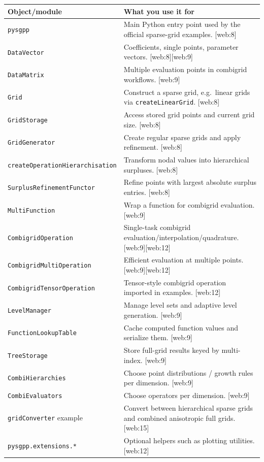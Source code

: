 \documentclass[11pt,a4paper]{article}
\begin{document}
\begin{center}
\begin{tabular}{@{}p{3.2cm}p{9.5cm}@{}}
\toprule
\textbf{Object/module} & \textbf{What you use it for} \\
\midrule
\texttt{pysgpp} & Main Python entry point used by the official sparse-grid examples. [web:8] \\
\texttt{DataVector} & Coefficients, single points, parameter vectors. [web:8][web:9] \\
\texttt{DataMatrix} & Multiple evaluation points in combigrid workflows. [web:9] \\
\texttt{Grid} & Construct a sparse grid, e.g.\ linear grids via \texttt{createLinearGrid}. [web:8] \\
\texttt{GridStorage} & Access stored grid points and current grid size. [web:8] \\
\texttt{GridGenerator} & Create regular sparse grids and apply refinement. [web:8] \\
\texttt{createOperationHierarchisation} & Transform nodal values into hierarchical surpluses. [web:8] \\
\texttt{SurplusRefinementFunctor} & Refine points with largest absolute surplus entries. [web:8] \\
\texttt{MultiFunction} & Wrap a function for combigrid evaluation. [web:9] \\
\texttt{CombigridOperation} & Single-task combigrid evaluation/interpolation/quadrature. [web:9][web:12] \\
\texttt{CombigridMultiOperation} & Efficient evaluation at multiple points. [web:9][web:12] \\
\texttt{CombigridTensorOperation} & Tensor-style combigrid operation imported in examples. [web:12] \\
\texttt{LevelManager} & Manage level sets and adaptive level generation. [web:9] \\
\texttt{FunctionLookupTable} & Cache computed function values and serialize them. [web:9] \\
\texttt{TreeStorage} & Store full-grid results keyed by multi-index. [web:9] \\
\texttt{CombiHierarchies} & Choose point distributions / growth rules per dimension. [web:9] \\
\texttt{CombiEvaluators} & Choose operators per dimension. [web:9] \\
\texttt{gridConverter} example & Convert between hierarchical sparse grids and combined anisotropic full grids. [web:15] \\
\texttt{pysgpp.extensions.*} & Optional helpers such as plotting utilities. [web:12] \\
\bottomrule
\end{tabular}
\end{center}
\end{document}
